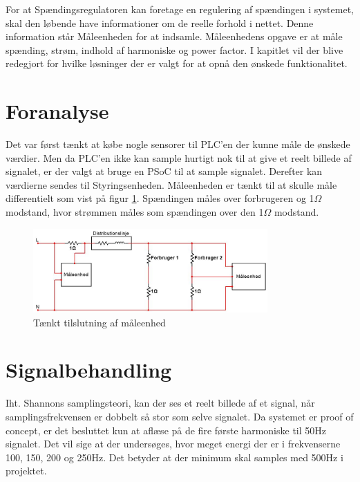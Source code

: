 
For at Spændingsregulatoren kan foretage en regulering af spændingen i systemet, skal den løbende have informationer om de reelle forhold i nettet. Denne information står Måleenheden for at indsamle. Måleenhedens opgave er at måle spænding, strøm, indhold af harmoniske og power factor. I kapitlet vil der blive redegjort for hvilke løsninger der er valgt for at opnå den ønskede funktionalitet. 

\section{Foranalyse}
Det var først tænkt at købe nogle sensorer til PLC'en der kunne måle de ønskede værdier. Men da PLC'en ikke kan sample hurtigt nok til at give et reelt billede af signalet, er der valgt at bruge en PSoC til at sample signalet. Derefter kan værdierne sendes til Styringsenheden. Måleenheden er tænkt til at skulle måle differentielt som vist på figur \ref{fig:MaalForanalyse}. Spændingen måles over forbrugeren og 1$\Omega$ modstand, hvor strømmen måles som spændingen over den 1$\Omega$ modstand.

\begin{figure}[H] %
	\centering
	\includegraphics[width=0.8\textwidth]{figure/MaalForanalyse}
	\caption{Tænkt tilslutning af måleenhed}
	\label{fig:MaalForanalyse}
\end{figure}

\section{Signalbehandling}

Iht. Shannons samplingsteori\cite{Shannon}, kan der ses et reelt billede af et signal, når samplingsfrekvensen er dobbelt så stor som selve signalet. Da systemet er proof of concept, er det besluttet kun at aflæse på de fire første harmoniske til 50Hz signalet. Det vil sige at der undersøges, hvor meget energi der er i frekvenserne 100, 150, 200 og 250Hz. Det betyder at der minimum skal samples med 500Hz i projektet.

